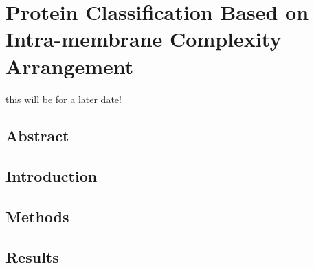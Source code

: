 
\chapter{Protein Classification Based on Intra-membrane Complexity Arrangement} %
\sloppy this will be for a later date!
\section{Abstract}
\section{Introduction}
\section{Methods}
\section{Results}
